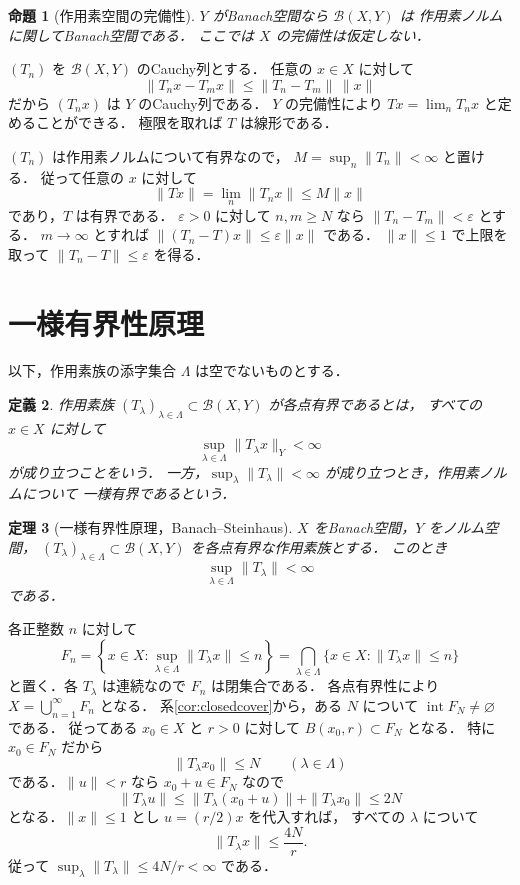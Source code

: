 \documentclass[a5paper,10pt,onecolumn]{jsarticle}
\makeatletter
\theoremstyle{mathnotetheorem}
\newtheorem{theorem}{定理}[section]
\newtheorem{definition}[theorem]{定義}
\newtheorem{proposition}[theorem]{命題}
\renewcommand{\proofname}{証明}
\renewenvironment{proof}[1][\proofname]{%
  \par\pushQED{\qed}\normalfont\topsep4\p@\@plus2\p@\relax
  \trivlist\item[\hskip\labelsep\bfseries #1]\ignorespaces
}{\popQED\endtrivlist\@endpefalse}
\makeatother
\begin{document}
\begin{proposition}[作用素空間の完備性]\label{prop:operator-complete}
$Y$ がBanach空間なら $\mathcal B(X,Y)$ は
作用素ノルムに関してBanach空間である．
ここでは $X$ の完備性は仮定しない．
\end{proposition}
\begin{proof}
$(T_n)$ を $\mathcal B(X,Y)$ のCauchy列とする．
任意の $x\in X$ に対して
\[
 \|T_nx-T_mx\|\le\|T_n-T_m\|\,\|x\|
\]
だから $(T_nx)$ は $Y$ のCauchy列である．
$Y$ の完備性により
$Tx=\lim_nT_nx$ と定めることができる．
極限を取れば $T$ は線形である．

$(T_n)$ は作用素ノルムについて有界なので，
$M=\sup_n\|T_n\|<\infty$ と置ける．
従って任意の $x$ に対して
\[
 \|Tx\|=\lim_n\|T_nx\|\le M\|x\|
\]
であり，$T$ は有界である．
$\varepsilon>0$ に対して $n,m\ge N$ なら
$\|T_n-T_m\|<\varepsilon$ とする．
$m\to\infty$ とすれば
$\|(T_n-T)x\|\le\varepsilon\|x\|$ である．
$\|x\|\le1$ で上限を取って
$\|T_n-T\|\le\varepsilon$ を得る．
\end{proof}

\section{一様有界性原理}

以下，作用素族の添字集合 $\Lambda$ は空でないものとする．

\begin{definition}
作用素族 $(T_\lambda)_{\lambda\in\Lambda}
\subset\mathcal B(X,Y)$ が\emph{各点有界}であるとは，
すべての $x\in X$ に対して
\[
 \sup_{\lambda\in\Lambda}\|T_\lambda x\|_Y<\infty
\]
が成り立つことをいう．
一方，$\sup_\lambda\|T_\lambda\|<\infty$
が成り立つとき，作用素ノルムについて
\emph{一様有界}であるという．
\end{definition}

\begin{theorem}[一様有界性原理，Banach--Steinhaus]\label{thm:ubp}
$X$ をBanach空間，$Y$ をノルム空間，
$(T_\lambda)_{\lambda\in\Lambda}\subset\mathcal B(X,Y)$
を各点有界な作用素族とする．
このとき
\[
 \sup_{\lambda\in\Lambda}\|T_\lambda\|<\infty
\]
である．
\end{theorem}
\begin{proof}
各正整数 $n$ に対して
\[
 F_n=\left\{x\in X:
   \sup_{\lambda\in\Lambda}\|T_\lambda x\|\le n\right\}
 =\bigcap_{\lambda\in\Lambda}
    \{x\in X:\|T_\lambda x\|\le n\}
\]
と置く．各 $T_\lambda$ は連続なので
$F_n$ は閉集合である．
各点有界性により
$X=\bigcup_{n=1}^\infty F_n$ となる．
系\ref{cor:closedcover}から，ある $N$ について
$\operatorname{int}F_N\ne\varnothing$ である．
従ってある $x_0\in X$ と $r>0$ に対して
$B(x_0,r)\subset F_N$ となる．
特に $x_0\in F_N$ だから
\[
 \|T_\lambda x_0\|\le N
 \qquad(\lambda\in\Lambda)
\]
である．$\|u\|<r$ なら $x_0+u\in F_N$ なので
\[
 \|T_\lambda u\|
 \le\|T_\lambda(x_0+u)\|+\|T_\lambda x_0\|
 \le2N
\]
となる．$\|x\|\le1$ とし $u=(r/2)x$ を代入すれば，
すべての $\lambda$ について
\[
 \|T_\lambda x\|\le \frac{4N}{r}.
\]
従って $\sup_\lambda\|T_\lambda\|\le4N/r<\infty$ である．
\end{proof}
\end{document}
